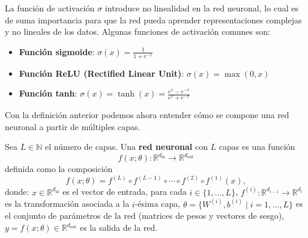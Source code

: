 \begin{observation}
    La función de activación $\sigma$ introduce no linealidad en la red neuronal, lo cual es de suma importancia para que la red pueda aprender representaciones complejas y no lineales de los datos.
    Algunas funciones de activación comunes son:
    \begin{itemize}
        \item \textbf{Función sigmoide}: $\sigma(x) = \frac{1}{1 + e^{-x}}$
        \item \textbf{Función ReLU (Rectified Linear Unit)}: $\sigma(x) = \max(0, x)$
        \item \textbf{Función tanh}: $\sigma(x) = \tanh(x) = \frac{e^x - e^{-x}}{e^x + e^{-x}}$
    \end{itemize}
\end{observation}

Con la definición anterior podemos ahora entender cómo se compone una red neuronal a partir de múltiples capas.

\begin{definition}
    Sea $L \in \mathbb{N}$ el número de capas. Una \textbf{red neuronal} con $L$ capas es una función
    \[
        f(x;\theta) : \mathbb{R}^{d_{\text{in}}} \longrightarrow \mathbb{R}^{d_{\text{out}}}
    \]
    definida como la composición
    \[
        f(x;\theta) = f^{(L)} \circ f^{(L-1)} \circ \dotsb \circ f^{(2)} \circ f^{(1)} (x),
    \]
    donde:
    $x \in \mathbb{R}^{d_{\text{in}}}$ es el vector de entrada, para cada $i \in \{1,\dotsc,L\}$, $f^{(i)} : \mathbb{R}^{d_{i-1}} \to \mathbb{R}^{d_i}$ es la transformación asociada a la $i$-ésima capa, $\theta = \{W^{(i)}, b^{(i)} \mid i=1,\dotsc,L\}$ es el conjunto de parámetros de la red (matrices de pesos y vectores de sesgo),$y = f(x;\theta) \in \mathbb{R}^{d_{\text{out}}}$ es la salida de la red.
\end{definition}

